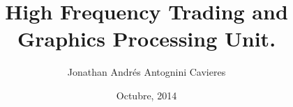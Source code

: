 \thispagestyle{fancy}

\rhead[]{}
\lhead[]{}

\renewcommand{\listalgorithmname}{Índice de algoritmos}
\renewcommand{\headrulewidth}{0.0pt}
\renewcommand{\chaptermark}[1]{\markleft{\thechapter #1}}
\renewcommand{\sectionmark}[1]{\markright{\thesection #1}}
\renewcommand{\chaptermark}[1]{\markboth{\chaptername \ \thechapter. #1}{}}

\newcommand{\contrib}[3]{#1\quad$<$\texttt{#2}$>$%
{\small\\\quad\textit{#3}}\\[1ex]}

\newcommand{\titulo}{%
    High Frequency Trading and Graphics Processing Unit.
}%
\newcommand{\autor}{Jonathan Andrés Antognini Cavieres}

\title{\titulo}
\author{\autor}

\date{Octubre, 2014}
\cfoot{\thepage}
\frenchspacing
\makeindex
